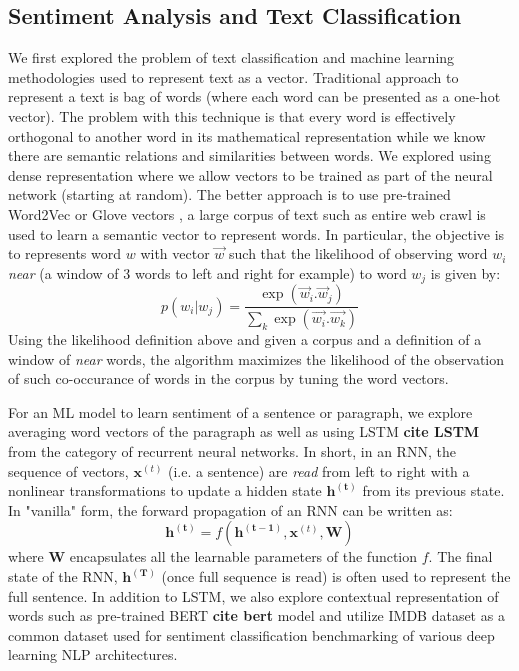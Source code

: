 \documentclass{article}
\begin{document}
\subsection{Sentiment Analysis and Text Classification}
We first explored the problem of text classification and machine learning methodologies used to represent text as a vector. Traditional 
approach to represent a text is bag of words (where each word
can be presented as a one-hot vector). The problem with this technique
is that every word is effectively orthogonal to another word in its
mathematical representation while we know there are semantic relations and 
similarities between words. We explored using dense representation
where we allow vectors to be trained as part of the neural network 
(starting at random). The better approach is to use pre-trained Word2Vec \citep{mikolov2013distributed} or Glove vectors \citep{pennington2014glove}, a large corpus of text
such as entire web crawl is used to learn a semantic vector to represent words.
In particular, the objective is to represents word $w$ with vector $\vec{w}$ such that the likelihood of observing word $w_i$ {\it near} (a window of 3 words to left and right for example) to word $w_j$ is given by:
\begin{equation}
p(w_i|w_j) = \frac{\exp(\vec{w}_i . \vec{w}_j)}{\sum_k \exp(\vec{w_i}.\vec{w_k})}
\end{equation}
Using the likelihood definition above and 
given a corpus and a definition of a window of {\it near} words, the
algorithm maximizes the likelihood of the observation of such co-occurance
of words in the corpus by tuning the word vectors.

For an ML model to learn sentiment of a sentence or paragraph, we explore
averaging word vectors of the paragraph as well as using LSTM {\bf cite LSTM}
from the category of recurrent neural networks. In short, in an RNN, 
the sequence of vectors, $\mathbf{x}^{(t)}$ (i.e. a sentence) are {\em read} 
from left to right with a nonlinear
transformations to update a hidden state $\mathbf{h^{(t)}}$ from
its previous state. In "vanilla" form, the forward propagation of
an RNN  can be written as:
\begin{equation}
    \mathbf{h^{(t)}} = f(\mathbf{h^{(t-1)}}, \mathbf{x}^{(t)}, \mathbf{W})
\end{equation}
where ${\mathbf W}$ encapsulates all the learnable parameters of the function $f$. The final state of the RNN, $\mathbf{h^{(T)}}$ (once full
sequence is read) is often used to represent the full sentence. 
In addition to LSTM, we also explore contextual representation
of words such as pre-trained BERT {\bf cite bert} model and
utilize IMDB dataset as a common dataset used for sentiment classification
benchmarking of various deep learning NLP architectures.
\end{document}
